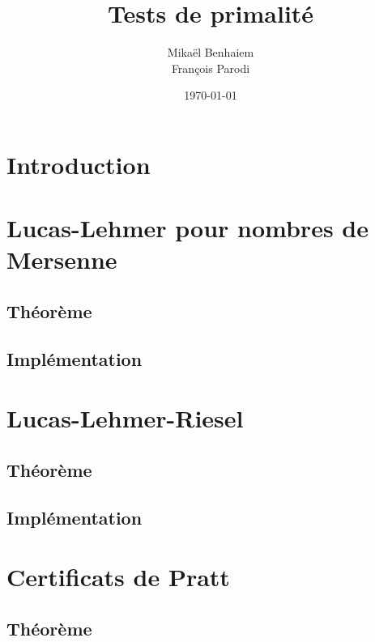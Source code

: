 \documentclass[a4paper]{article}
\begin{document}
\lstset{language=C,
	breaklines=true,
	basicstyle=\ttfamily
	}

\title{Tests de primalité}
\author{Mikaël Benhaiem\\
François Parodi}
\date{\today}

\maketitle

\newpage

\tableofcontents

\newpage

\section*{Introduction}

\section{Lucas-Lehmer pour nombres de Mersenne}

\subsection{Théorème}

\subsection{Implémentation}

\section{Lucas-Lehmer-Riesel}

\subsection{Théorème}

\subsection{Implémentation}

\section{Certificats de Pratt}

\subsection{Théorème}
\end{document}
